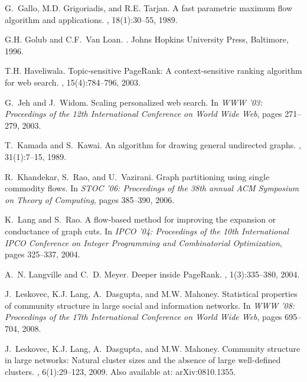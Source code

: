 \documentclass[11pt]{article}
\begin{document}
\begin{thebibliography}{10}
G.~Gallo, M.D. Grigoriadis, and R.E. Tarjan.
\newblock A fast parametric maximum flow algorithm and applications.
, 18(1):30--55, 1989.

G.H. Golub and C.F.~Van Loan.
.
\newblock Johns Hopkins University Press, Baltimore, 1996.

T.H. Haveliwala.
\newblock Topic-sensitive {PageRank}: A context-sensitive ranking algorithm for
  web search.
,
  15(4):784--796, 2003.

G.~Jeh and J.~Widom.
\newblock Scaling personalized web search.
\newblock In {\em WWW '03: Proceedings of the 12th International Conference on
  World Wide Web}, pages 271--279, 2003.

T.~Kamada and S.~Kawai.
\newblock An algorithm for drawing general undirected graphs.
, 31(1):7--15, 1989.

R.~Khandekar, S.~Rao, and U.~Vazirani.
\newblock Graph partitioning using single commodity flows.
\newblock In {\em STOC '06: Proceedings of the 38th annual ACM Symposium on
  Theory of Computing}, pages 385--390, 2006.

K.~Lang and S.~Rao.
\newblock A flow-based method for improving the expansion or conductance of
  graph cuts.
\newblock In {\em IPCO '04: Proceedings of the 10th International IPCO
  Conference on Integer Programming and Combinatorial Optimization}, pages
  325--337, 2004.

A.~N. Langville and C.~D. Meyer.
\newblock Deeper inside {PageRank}.
, 1(3):335--380, 2004.

J.~Leskovec, K.J. Lang, A.~Dasgupta, and M.W. Mahoney.
\newblock Statistical properties of community structure in large social and
  information networks.
\newblock In {\em WWW '08: Proceedings of the 17th International Conference on
  World Wide Web}, pages 695--704, 2008.

J.~Leskovec, K.J. Lang, A.~Dasgupta, and M.W. Mahoney.
\newblock Community structure in large networks: Natural cluster sizes and the
  absence of large well-defined clusters.
, 6(1):29--123, 2009.
\newblock Also available at: arXiv:0810.1355.


\end{thebibliography}
\end{document}
